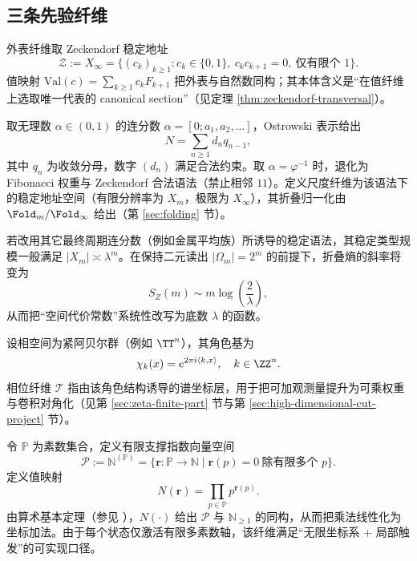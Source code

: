 \subsection{三条先验纤维}\label{subsec:pom-fibers}
\begin{definition}\label{def:pom-observable-fiber}
外表纤维取 Zeckendorf 稳定地址
\[
\mathcal Z:=X_\infty=\{(c_k)_{k\ge 1}: c_k\in\{0,1\},\ c_kc_{k+1}=0,\ \text{仅有限个 }1\}.
\]
值映射 $\mathrm{Val}(c)=\sum_{k\ge 1}c_kF_{k+1}$ 把外表与自然数同构；其本体含义是“在值纤维上选取唯一代表的 canonical section”（见定理 \ref{thm:zeckendorf-transversal}）。
\end{definition}

\begin{definition}\label{def:pom-scale-fiber}
取无理数 $\alpha\in(0,1)$ 的连分数 $\alpha=[0;a_1,a_2,\dots]$，Ostrowski 表示给出
\[
N=\sum_{n\ge 1} d_n q_{n-1},
\]
其中 $q_n$ 为收敛分母，数字 $(d_n)$ 满足合法约束。取 $\alpha=\varphi^{-1}$ 时，退化为 Fibonacci 权重与 Zeckendorf 合法语法（禁止相邻 $11$）。定义尺度纤维为该语法下的稳定地址空间（有限分辨率为 $X_m$，极限为 $X_\infty$），其折叠归一化由 $\Fold_m/\Fold_\infty$ 给出（第 \ref{sec:folding} 节）。
\end{definition}

\begin{remark}[更换尺度的代价斜率]\label{rem:pom-scale-slope}
若改用其它最终周期连分数（例如金属平均族）所诱导的稳定语法，其稳定类型规模一般满足 $|X_m|\asymp \lambda^m$。在保持二元读出 $|\Omega_m|=2^m$ 的前提下，折叠熵的斜率将变为
\[
S_Z(m)\sim m\log\!\left(\frac{2}{\lambda}\right),
\]
从而把“空间代价常数”系统性改写为底数 $\lambda$ 的函数。
\end{remark}

\begin{definition}\label{def:pom-phase-fiber}
设相空间为紧阿贝尔群（例如 $\TT^n$），其角色基为
\[
\chi_k(x)=e^{2\pi i\langle k,x\rangle},\quad k\in\ZZ^n.
\]
相位纤维 $\mathcal{T}$ 指由该角色结构诱导的谱坐标层，用于把可加观测量提升为可乘权重与卷积对角化（见第 \ref{sec:zeta-finite-part} 节与第 \ref{sec:high-dimensional-cut-project} 节）。
\end{definition}

\begin{definition}\label{def:pom-prime-fiber}
令 $\mathbb{P}$ 为素数集合，定义有限支撑指数向量空间
\[
\mathcal{P}:=\mathbb{N}^{(\mathbb{P})}=\{\mathbf{r}:\mathbb{P}\to\mathbb{N}\mid \mathbf{r}(p)=0\ \text{除有限多个 }p\}.
\]
定义值映射
\[
N(\mathbf{r})=\prod_{p\in\mathbb{P}} p^{\mathbf{r}(p)}.
\]
由算术基本定理（参见 \cite{Apostol1976}），$N(\cdot)$ 给出 $\mathcal{P}$ 与 $\mathbb{N}_{\ge 1}$ 的同构，从而把乘法线性化为坐标加法。由于每个状态仅激活有限多素数轴，该纤维满足“无限坐标系 + 局部触发”的可实现口径。
\end{definition}

